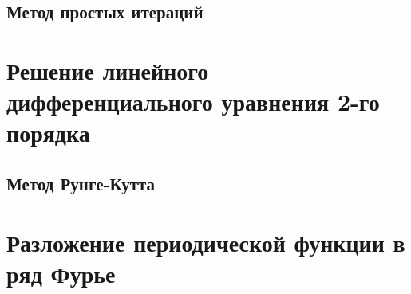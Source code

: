 \documentclass{article}
\begin{document}
\subsection{Метод простых итераций}

\section{Решение линейного дифференциального уравнения 2-го порядка}
\subsection{Метод Рунге-Кутта}

\section{Разложение периодической функции в ряд Фурье}
\end{document}
